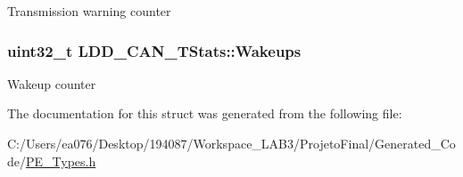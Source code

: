 Transmission warning counter \hypertarget{struct_l_d_d___c_a_n___t_stats_ab59425105119b5b6496a6e0fcc8398d5}{
\subsubsection[{Wakeups}]{\setlength{\rightskip}{0pt plus 5cm}uint32\-\_\-t L\-D\-D\-\_\-\-C\-A\-N\-\_\-\-T\-Stats\-::\-Wakeups}}\label{struct_l_d_d___c_a_n___t_stats_ab59425105119b5b6496a6e0fcc8398d5}
Wakeup counter 

The documentation for this struct was generated from the following file\-:\begin{DoxyCompactItemize}
\item 
C\-:/\-Users/ea076/\-Desktop/194087/\-Workspace\-\_\-\-L\-A\-B3/\-Projeto\-Final/\-Generated\-\_\-\-Code/\hyperlink{_p_e___types_8h}{P\-E\-\_\-\-Types.\-h}\end{DoxyCompactItemize}
